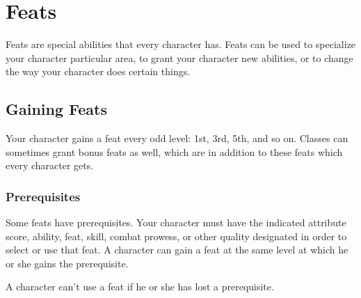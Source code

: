 \chapter{Feats}\label{Feats}

Feats are special abilities that every character has.
Feats can be used to specialize your character particular area, to grant your character new abilities, or to change the way your character does certain things.

\section{Gaining Feats}
    Your character gains a feat every odd level: 1st, 3rd, 5th, and so on.
    Classes can sometimes grant bonus feats as well, which are in addition to these feats which every character gets.

    \subsection{Prerequisites}
        Some feats have prerequisites.
        Your character must have the indicated attribute score, ability, feat, skill, combat prowess, or other quality designated in order to select or use that feat.
        A character can gain a feat at the same level at which he or she gains the prerequisite.

        A character can't use a feat if he or she has lost a prerequisite.

